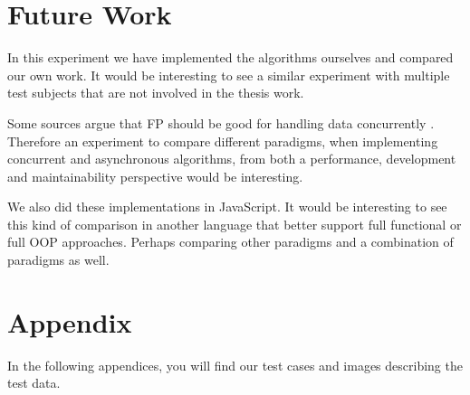 \documentclass {article}
\begin{document}
\section{Future Work}
In this experiment we have implemented the algorithms ourselves and compared our own work. It would be interesting to see a similar experiment with multiple test subjects that are not involved in the thesis work. 
 
Some sources argue that FP should be good for handling data concurrently \cite{meijer, eriksen, dobre}. Therefore an experiment to compare different paradigms,  when implementing concurrent and asynchronous algorithms, from both a performance, development and maintainability perspective would be interesting. 
 
We also did these implementations in JavaScript. It would be interesting to see this kind of comparison in another language that better support full functional or full OOP approaches. Perhaps comparing other paradigms and a combination of paradigms as well.
\newpage
 


\newpage
\appendix
\section{Appendix}
\label{appendix:test-cases}
In the following appendices, you will find our test cases and images describing the test data.
\end{document}
